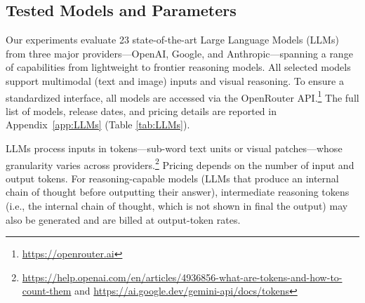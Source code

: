 \documentclass[12pt,a4paper]{article}
\newcommand{\SC}[1]{\textcolor{violet}{SC: #1}}
\begin{document}

\subsection{Tested Models and Parameters}

Our experiments evaluate 23 state-of-the-art Large Language Models (LLMs) from three major providers---OpenAI, Google, and Anthropic---spanning a range of capabilities from lightweight to frontier reasoning models. All selected models support multimodal (text and image) inputs and visual reasoning. To ensure a standardized interface, all models are accessed via the OpenRouter API.\footnote{\url{https://openrouter.ai}} The full list of models, release dates, and pricing details are reported in Appendix~\ref{app:LLMs} (Table \ref{tab:LLMs}).


LLMs process inputs in tokens---sub-word text units or visual patches---whose granularity varies across providers.\footnote{ \url{https://help.openai.com/en/articles/4936856-what-are-tokens-and-how-to-count-them} and \url{https://ai.google.dev/gemini-api/docs/tokens}} Pricing depends on the number of input and output tokens. For reasoning-capable models (LLMs that produce an internal chain of thought before outputting their answer), intermediate reasoning tokens (i.e., the internal chain of thought, which is not shown in final the output) may also be generated and are billed at output-token rates.
\end{document}
